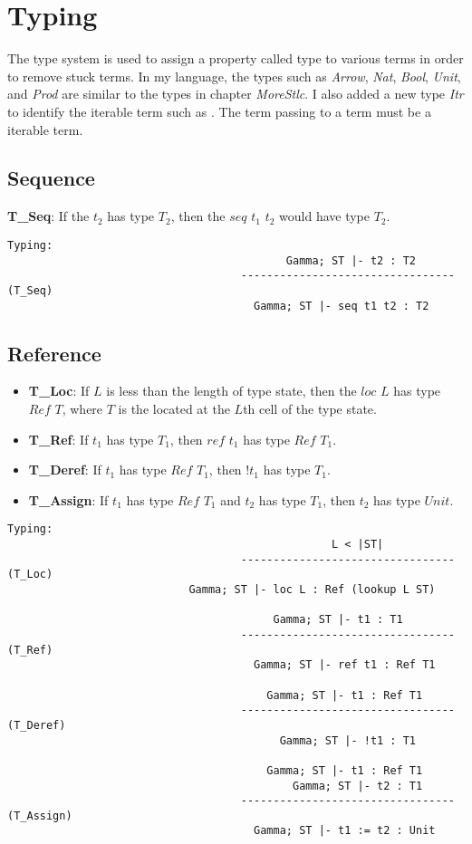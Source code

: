 \section{Typing}
\label{sec:type}
The type system is used to assign a property called type to various terms in order to remove stuck terms. 
In my language, the types such as \textit{Arrow}, \textit{Nat}, \textit{Bool}, \textit{Unit}, and \textit{Prod} are similar to the types in chapter \textit{MoreStlc}.
I also added a new type \textit{Itr} to identify the iterable term such as \gen. 
The term passing to a \nt term must be a iterable term.

\subsection{Sequence}
\textbf{T_Seq}: If the $t_2$ has type $T_2$, then the $seq$ $t_1$ $t_2$ would have type $T_2$. 
\begin{lstlisting}
Typing:
										   Gamma; ST |- t2 : T2
									---------------------------------   (T_Seq)
									  Gamma; ST |- seq t1 t2 : T2
\end{lstlisting}

\subsection{Reference}
\begin{itemize}
	\item \textbf{T_Loc}: If $L$ is less than the length of type state, then the $loc$ $L$ has type $Ref$ $T$, where $T$ is the located at the $L$th cell of the type state.
	\item \textbf{T_Ref}: If $t_1$ has type $T_1$, then $ref$ $t_1$ has type $Ref$ $T_1$.
	\item \textbf{T_Deref}: If $t_1$ has type $Ref$ $T_1$, then $!t_1$ has type $T_1$.
	\item \textbf{T_Assign}: If $t_1$ has type $Ref$ $T_1$ and $t_2$ has type $T_1$, then $t_2$ has type $Unit$.
\end{itemize}
\begin{lstlisting}
Typing:
										          L < |ST|
									---------------------------------   (T_Loc)
							Gamma; ST |- loc L : Ref (lookup L ST)

									     Gamma; ST |- t1 : T1
									---------------------------------   (T_Ref)
									  Gamma; ST |- ref t1 : Ref T1

									    Gamma; ST |- t1 : Ref T1
									---------------------------------   (T_Deref)
									      Gamma; ST |- !t1 : T1

									  	Gamma; ST |- t1 : Ref T1
										    Gamma; ST |- t2 : T1
									---------------------------------   (T_Assign)
									  Gamma; ST |- t1 := t2 : Unit
\end{lstlisting}

